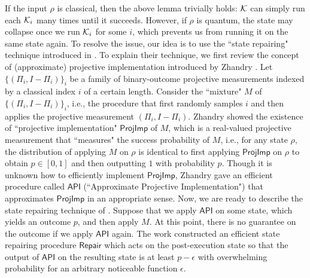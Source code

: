 If the input $\rho$ is classical, then the above lemma trivially holds: $\mathcal{K}$ can simply run each $\mathcal{K}_i$ many times until it succeeds. However, if $\rho$ is quantum, the state may collapse once we run $\mathcal{K}_i$ for some $i$, which prevents us from running it on the same state again. To resolve the issue, our idea is to use the ``state repairing" technique introduced in \cite{FOCS:CMSZ21}. 
To explain their technique, we first review the concept of (approximate) projective implementation introduced by Zhandry \cite{TCC:Zhandry20}. 
Let $\{(\Pi_i,I-\Pi_i)\}_i$ be a family of binary-outcome projective measurements %
indexed by a classical index $i$ of a certain length. 
Consider the ``mixture" $M$ of  $\{(\Pi_i,I-\Pi_i)\}_i$, i.e., the procedure that first randomly samples $i$ and then applies the projective measurement  $(\Pi_i,I-\Pi_i)$.  
Zhandry showed the existence of ``projective implementation" $\mathsf{ProjImp}$ of $M$, which is a real-valued projective measurement that ``measures" the success probability of $M$, i.e., for any state $\rho$, the distribution of applying $M$ on $\rho$ is identical to first applying $\mathsf{ProjImp}$ on $\rho$ to obtain $p\in [0,1]$ and then outputting $1$ with probability $p$. 
Though it is unknown how to efficiently implement $\mathsf{ProjImp}$, Zhandry gave an efficient procedure called $\mathsf{API}$ (``Approximate Projective Implementation") that approximates $\mathsf{ProjImp}$ in an appropriate sense. 
Now, we are ready to describe the state repairing technique of \cite{FOCS:CMSZ21}. 
Suppose that we apply $\mathsf{API}$ on some state, which yields an outcome $p$, and then apply $M$.  
At this point, there is no guarantee on the outcome if we apply $\mathsf{API}$ again.  
The work \cite{FOCS:CMSZ21} constructed an efficient state repairing procedure $\mathsf{Repair}$ which acts on the post-execution state so that the output of $\mathsf{API}$ on the resulting state is at least $p-\epsilon$ with overwhelming probability for an arbitrary noticeable function $\epsilon$. 

